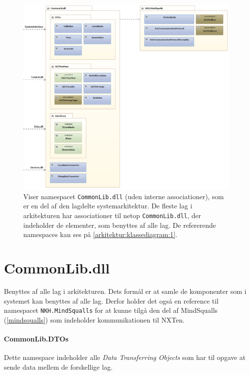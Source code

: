 \begin{figure}
\centering
\includegraphics[width=1\textwidth]{./graphics/systemarkitektur_2}
\caption{Viser namespacet \lstinline[style=csharp]!CommonLib.dll! (uden interne associationer), som er en del af den lagdelte systemarkitektur. De fleste lag i arkitekturen har associationer til netop \lstinline[style=csharp]!CommonLib.dll!, der indeholder de elementer, som benyttes af alle lag. De refererende namespaces kan ses på \cref{arkitektur:klassediagram:1}.}
\label{arkitektur:klassediagram:2}
\end{figure}
\section{CommonLib.dll}\label{arkitektur:commonlib}
Benyttes af alle lag i arkitekturen.
Dets formål er at samle de komponenter som i systemet kan benyttes af alle lag.
Derfor holder det også en reference til namespacet \lstinline[style=csharp]!NKH.MindSqualls! for at kunne tilgå den del af MindSqualls (\cref{mindsqualls}) som indeholder kommunikationen til NXTen.

\paragraph{CommonLib.DTOs}
Dette namespace indeholder alle \textit{Data Transferring Objects} som har til opgave at sende data mellem de forskellige lag.

